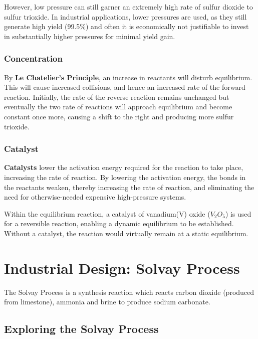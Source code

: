 \documentclass[12pt, a4paper]{article}
\begin{document}
However, low pressure can still garner an extremely high rate of sulfur dioxide to sulfur trioxide. In industrial applications, lower pressures are used, as they still generate high yield (99.5\%) and often it is economically not justifiable to invest in substantially higher pressures for minimal yield gain.






\subsubsection{Concentration}

By \textbf{Le Chatelier's Principle}, an increase in reactants will disturb equilibrium. This will cause increased collisions, and hence an increased rate of the forward reaction. Initially, the rate of the reverse reaction remains unchanged but eventually the two rate of reactions will approach equilibrium and become constant once more, causing a shift to the right and producing more sulfur trioxide. 






\subsubsection{Catalyst}

\textbf{Catalysts} lower the activation energy required for the reaction to take place, increasing the rate of reaction. By lowering the activation energy, the bonds in the reactants weaken, thereby increasing the rate of reaction, and eliminating the need for otherwise-needed expensive high-pressure systems.

Within the equilibrium reaction, a catalyst of vanadium(V) oxide (\(V_{2}O_{5}\)) is used for a reversible reaction, enabling a dynamic equilibrium to be established. Without a catalyst, the reaction would virtually remain at a static equilibrium.






\section{Industrial Design: Solvay Process}

The Solvay Process is a synthesis reaction which reacts carbon dioxide (produced from limestone), ammonia and brine to produce sodium carbonate. 


\subsection{Exploring the Solvay Process}
\end{document}
